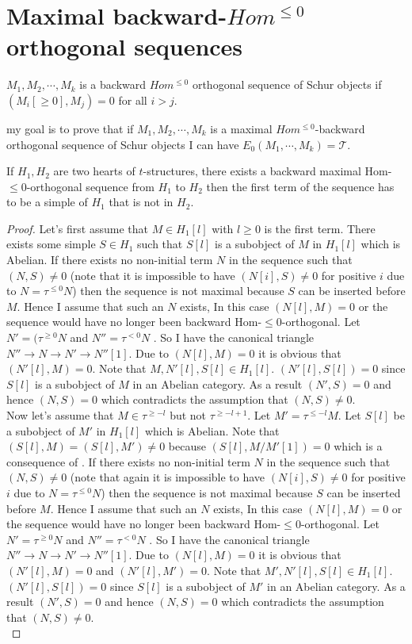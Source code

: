 \section{Maximal backward-$Hom^{\leq 0}$ orthogonal sequences}
\begin{definition}
$M_1,M_2,\cdots, M_k$ is a backward $Hom^{\leq 0}$ orthogonal sequence of Schur objects if $(M_i[\geq 0], M_j) = 0$ for all $i>j$.
\end{definition}
\indent my goal is to prove that if $M_1,M_2,\cdots, M_k$ is a maximal $Hom^{\leq 0}$-backward orthogonal sequence of Schur objects I can have $E_0(M_1,\cdots, M_k)=\mathcal{T}$.
\begin{lemma}\label{lem:C3L1}
If $H_1, H_2$ are two hearts of $t$-structures, there exists a backward maximal Hom-$\leq 0$-orthogonal sequence from $H_1$ to $H_2$ then the first term of the sequence has to be a simple of $H_1$ that is not in $H_2$.
\end{lemma}
\begin{proof}
\indent Let's first assume that $M\in H_1[l]$ with $l\geq 0$ is the first term. There exists some simple $S\in H_1$ such that $S[l]$ is a subobject of $M$ in $H_1[l]$ which is Abelian. If there exists no non-initial term $N$ in the sequence such that $(N,S) \neq 0$ (note that it is impossible to have $(N[i],S)\neq 0$ for positive $i$ due to $N=\tau^{\leq 0}N$) then the sequence is not maximal because $S$ can be inserted before $M$. Hence I assume that such an $N$ exists, In this case $(N[l],M)= 0$ or the sequence would have no longer been backward Hom-$\leq 0$-orthogonal. Let $N' = (\tau^{\geq 0}N$ and $N'' = \tau^{<0} N$ . So I have the canonical triangle $N''\to N\to N'\to N''[1]$. Due to $(N[l],M) = 0$ it is obvious that $(N'[l],M) = 0$. Note that $M, N'[l], S[l]\in H_1[l]$. $(N'[l],S[l]) = 0$ since $S[l]$ is a subobject of $M$ in an Abelian category. As a result $(N',S) = 0$ and hence $(N,S) = 0$ which contradicts the assumption that $(N,S)\neq 0$.\\
\indent Now let's assume that $M\in \tau^{\geq -l}$ but not $\tau^{\geq -l+1}$. Let $M' = \tau^{\leq -l}M$. Let $S[l]$ be a subobject of $M'$ in $H_1[l]$ which is Abelian. Note that $(S[l],M) = (S[l],M')\neq 0$ because $(S[l], M/M'[1]) = 0$ which is a consequence of . If there exists no non-initial term $N$ in the sequence such that $(N,S) \neq 0$ (note that again it is impossible to have $(N[i],S)\neq 0$ for positive $i$ due to $N=\tau^{\leq 0}N$) then the sequence is not maximal because $S$ can be inserted before $M$. Hence I assume that such an $N$ exists, In this case $(N[l],M)= 0$ or the sequence would have no longer been backward Hom-$\leq 0$-orthogonal. Let $N' = \tau^{\geq 0}N$ and $N'' = \tau^{<0} N$ . So I have the canonical triangle $N''\to N\to N'\to N''[1]$. Due to $(N[l],M) = 0$ it is obvious that $(N'[l],M) = 0$ and $(N'[l],M')=0$. Note that $M', N'[l], S[l]\in H_1[l]$. $(N'[l],S[l]) = 0$ since $S[l]$ is a subobject of $M'$ in an Abelian category. As a result $(N',S) = 0$ and hence $(N,S) = 0$ which contradicts the assumption that $(N,S)\neq 0$.\\
\end{proof}
